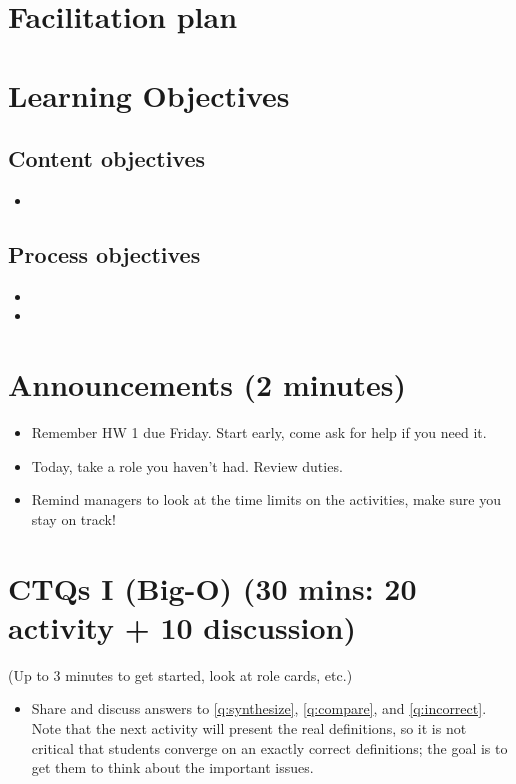 \documentclass{tufte-handout}
\begin{document}
\newpage

\section{Facilitation plan}
\label{sec:facilitation}

\section{Learning Objectives}

\subsection{Content objectives}

\begin{itemize}
\item \lobjectiveA
\end{itemize}

\subsection{Process objectives}

\begin{itemize}
\item \pobjectiveA
\item \pobjectiveB
\end{itemize}

\section{Announcements (2 minutes)}

\begin{itemize}
\item Remember HW 1 due Friday.  Start early, come ask for help if you
  need it.
\item Today, take a role you haven't had.  Review duties.
\item Remind managers to look at the time limits on the activities,
  make sure you stay on track!
\end{itemize}

\section{CTQs I (Big-O) (30 mins: 20 activity + 10 discussion)}

(Up to 3 minutes to get started, look at role cards, etc.)

\begin{itemize}
\item Share and discuss answers to \ref{q:synthesize},
  \ref{q:compare}, and \ref{q:incorrect}.  Note that the next activity
  will present the real definitions, so it is not critical that
  students converge on an exactly correct definitions; the goal is to
  get them to think about the important issues.
\end{itemize}
\end{document}
